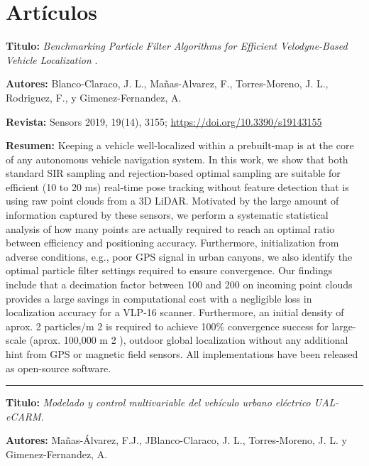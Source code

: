 \section{Artículos}
\textbf{Titulo:} \textit{Benchmarking Particle Filter Algorithms for Efficient Velodyne-Based Vehicle Localization} \cite{blanco2019benchmarking}.

\textbf{Autores:} Blanco-Claraco, J. L., Mañas-Alvarez, F., Torres-Moreno, J. L., Rodriguez, F., y Gimenez-Fernandez, A.

\textbf{Revista:} Sensors 2019, 19(14), 3155; \url{https://doi.org/10.3390/s19143155}

\textbf{Resumen:} Keeping a vehicle well-localized within a prebuilt-map is at the core of any autonomous vehicle navigation system. In this work, we show that both standard SIR sampling and rejection-based optimal sampling are suitable for efficient (10 to 20 ms) real-time pose tracking without feature detection that is using raw point clouds from a 3D LiDAR. Motivated by the large amount of information captured by these sensors, we perform a systematic statistical analysis of how many points are actually required to reach an optimal ratio between efficiency and positioning accuracy. Furthermore, initialization from adverse conditions, e.g., poor GPS signal in urban canyons, we also identify the optimal particle filter settings required to ensure convergence. Our findings include that a decimation factor between 100 and 200 on incoming point clouds provides a large savings in computational cost with a negligible loss in localization accuracy for a VLP-16 scanner. Furthermore, an initial density of aprox. 2 particles/m 2 is required to achieve 100\% convergence success for large-scale (aprox. 100,000 m 2 ), outdoor global localization without any additional hint from GPS or magnetic field sensors. All implementations have been released as open-source software.

\vspace{6pt} \hrule \vspace{6pt}

\textbf{Titulo:} \textit{Modelado y control multivariable del vehículo urbano eléctrico UAL-eCARM}\cite{manas2020byWire}.

\textbf{Autores:} Mañas-Álvarez, F.J., JBlanco-Claraco, J. L., Torres-Moreno, J. L. y Gimenez-Fernandez, A.

